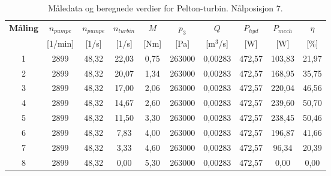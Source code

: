 
\begin{table}[htbp]
\centering
\caption{Måledata og beregnede verdier for Pelton-turbin. Nålposisjon 7.}
\label{tab:pelton2}
\small
\begin{tabular}{
  c
  S[table-format=4.0]
  S[table-format=2.2]
  S[table-format=2.2]
  S[table-format=1.2]
  S[table-format=6.0]
  S[table-format=1.5]
  S[table-format=3.2]
  S[table-format=3.2]
  S[table-format=2.2]
}
\toprule
{\textbf{Måling}} &
{\textbf{$n_{pumpe}$}} &
{\textbf{$n_{pumpe}$}} &
{\textbf{$n_{turbin}$}} &
{\textbf{$M$}} &
{\textbf{$p_3$}} &
{\textbf{$Q$}} &
{\textbf{$P_{hyd}$}} &
{\textbf{$P_{mech}$}} &
{\textbf{$\eta$}} \\
 &
{\small [1/min]} &
{\small [1/s]} &
{\small [1/s]} &
{\small [Nm]} &
{\small [Pa]} &
{\small [m$^3$/s]} &
{\small [W]} &
{\small [W]} &
{\small [\%]} \\
 & 2899 & 48,32 & 22,03 & 0,75 & 263000 & 0,00283 & 472,57 & 103,83 & 21,97 \\
2 & 2899 & 48,32 & 20,07 & 1,34 & 263000 & 0,00283 & 472,57 & 168,95 & 35,75 \\
3 & 2899 & 48,32 & 17,00 & 2,06 & 263000 & 0,00283 & 472,57 & 220,04 & 46,56 \\
4 & 2899 & 48,32 & 14,67 & 2,60 & 263000 & 0,00283 & 472,57 & 239,60 & 50,70 \\
5 & 2899 & 48,32 & 11,50 & 3,30 & 263000 & 0,00283 & 472,57 & 238,45 & 50,46 \\
6 & 2899 & 48,32 &  7,83 & 4,00 & 263000 & 0,00283 & 472,57 & 196,87 & 41,66 \\
7 & 2899 & 48,32 &  3,33 & 4,60 & 263000 & 0,00283 & 472,57 &  96,34 & 20,39 \\
8 & 2899 & 48,32 &  0,00 & 5,30 & 263000 & 0,00283 & 472,57 &   0,00 &  0,00 \\
\bottomrule
\end{tabular}
\end{table}




